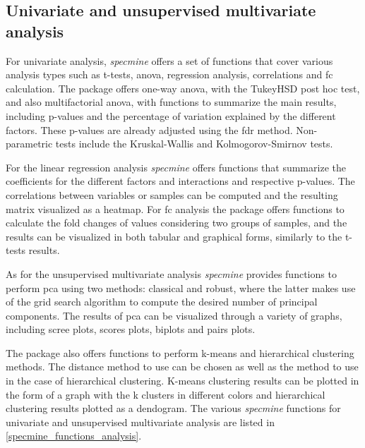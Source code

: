 \subsection{Univariate and unsupervised multivariate analysis}

For univariate analysis, \textit{specmine} offers a set of functions that cover various analysis types such as t-tests, \gls{anova}, regression analysis, correlations and \gls{fc} calculation. The package offers one-way \gls{anova}, with the TukeyHSD post hoc test, and also multifactorial \gls{anova}, with functions to summarize the main results, including p-values and the percentage of variation explained by the different factors. These p-values are already adjusted using the \gls{fdr} method. Non-parametric tests include the Kruskal-Wallis and Kolmogorov-Smirnov tests. 

For the linear regression analysis \textit{specmine} offers functions that summarize the coefficients for the different factors and interactions and respective p-values. The correlations between variables or samples can be computed and the resulting matrix visualized as a heatmap. For \gls{fc} analysis the package offers functions to calculate the fold changes of values considering two groups of samples, and the results can be visualized in both tabular and graphical forms, similarly to the t-tests results.
 
As for the unsupervised multivariate analysis \textit{specmine} provides functions to perform \gls{pca} using two methods: classical and robust, where the latter makes use of the grid search algorithm to compute the desired number of principal components. The results of \gls{pca} can be visualized through a variety of graphs, including scree plots, scores plots, biplots and pairs plots. 

The package also offers functions to perform k-means and hierarchical clustering methods. The distance method to use can be chosen as well as the method to use in the case of hierarchical clustering. K-means clustering results can be plotted in the form of a graph with the k clusters in different colors and hierarchical clustering results plotted as a dendogram. The various \textit{specmine} functions for univariate and unsupervised multivariate analysis are listed in \autoref{specmine_functions_analysis}.



